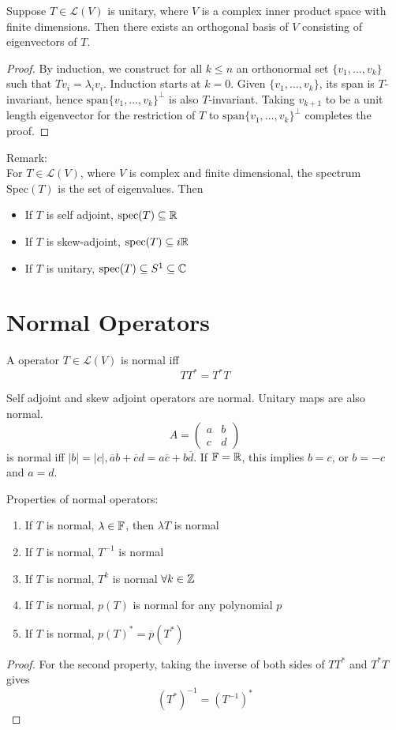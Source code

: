 \documentclass[12pt]{article}
\begin{document}
\begin{thm}
	Suppose $T \in \mathcal L(V)$ is unitary, where $V$ is a complex inner product space with finite dimensions. Then there exists an orthogonal basis of $V$ consisting of eigenvectors of $T$.
\end{thm}

\begin{proof}
	By induction, we construct for all $k \leq n$ an orthonormal set $\{v_1,\dots,v_k\}$ such that $Tv_i = \lambda_iv_i$. Induction starts at $k=0$. Given $\{v_1,\dots,v_k\}$, its span is $T$-invariant, hence $\text{span}\{v_1,\dots,v_k\}^\perp$ is also $T$-invariant. Taking $v_{k+1}$ to be a unit length eigenvector for the restriction of $T$ to $\text{span}\{v_1,\dots,v_k\}^\perp$ completes the proof.
\end{proof}

Remark: \\
For $T \in \mathcal L(V)$, where $V$ is complex and finite dimensional, the spectrum $\text{Spec}(T)$ is the set of eigenvalues. Then
\begin{itemize}
	\item If $T$ is self adjoint, $\text{spec}(T) \subseteq \mathbb{R}$
	\item If $T$ is skew-adjoint, $\text{spec}(T) \subseteq i\mathbb{R}$
	\item If $T$ is unitary, $\text{spec}(T) \subseteq S^1 \subseteq \mathbb{C}$
\end{itemize}

\section{Normal Operators}

\begin{defn}
	A operator $T \in \mathcal L(V)$ is normal iff
	$$TT^* = T^*T$$
\end{defn}

\begin{ex}
	Self adjoint and skew adjoint operators are normal. Unitary maps are also normal.
	$$A = \begin{pmatrix} a & b \\ c & d \end{pmatrix}$$
	is normal iff $|b| = |c|, \overline{a}b + \overline{c}d = a\overline{c} + b\overline{d}$. If $\mathbb{F} = \mathbb{R}$, this implies $b=c$, or $b=-c$ and $a=d$.
\end{ex}

Properties of normal operators:

\begin{enumerate}
	\item If $T$ is normal, $\lambda \in \mathbb{F}$, then $\lambda T$ is normal
	\item If $T$ is normal, $T^{-1}$ is normal
	\item If $T$ is normal, $T^k$ is normal $\forall k \in \mathbb{Z}$
	\item If $T$ is normal, $p(T)$ is normal for any polynomial $p$
	\item If $T$ is normal, $p(T)^* = \overline{p}(T^*)$
\end{enumerate}

\begin{proof}
	For the second property, taking the inverse of both sides of
	$TT^*$ and $T^*T$ gives
	$$(T^*)^{-1} = (T^{-1})^*$$
\end{proof}
\end{document}
